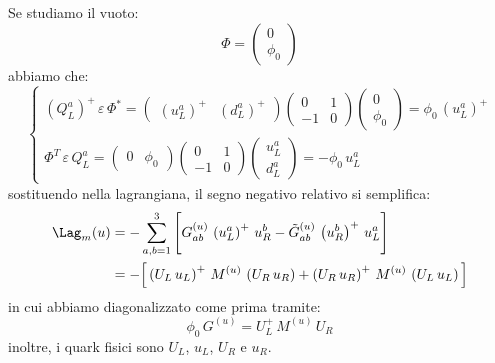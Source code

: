 Se studiamo il vuoto:
\begin{equation}
    \Phi = \begin{pmatrix}
        0 \\
        \phi_0
    \end{pmatrix}
\end{equation}
abbiamo che:
\begin{equation}
    \begin{cases}
        \left(Q_L^a\right)^+\, \varepsilon\, \Phi^* = \begin{pmatrix}
            \left(u_L^a\right)^+ & \left(d_L^a\right)^+
        \end{pmatrix}\begin{pmatrix}
            0 & 1 \\
            -1 & 0
        \end{pmatrix} \begin{pmatrix}
            0 \\
            \phi_0
        \end{pmatrix} = \phi_0\, \left(u_L^a\right)^+ \\
        \Phi^T\, \varepsilon\, Q_L^a = \begin{pmatrix}
            0 & \phi_0
        \end{pmatrix}\begin{pmatrix}
            0 & 1 \\
            -1 & 0
        \end{pmatrix} \begin{pmatrix}
            u_L^a \\
            d_L^a
        \end{pmatrix} = -\phi_0\, u_L^a
    \end{cases}
\end{equation}
sostituendo nella lagrangiana, il segno negativo relativo si semplifica:
\begin{align}
    \Lag_m(u) &= -\sum_{a,b=1}^3\Bigg[ G_{ab}^{(u)}\, \left(u_L^a\right)^+\, u_R^b - \tilde{G}_{ab}^{(u)}\, \left(u_R^b\right)^+\, u_L^a \Bigg] \\
    &= -\Big[ \left(U_L\, u_L\right)^+\, M^{(u)}\, \left(U_R\, u_R\right) + \left(U_R\, u_R\right)^+\, M^{(u)}\, \left(U_L\, u_L\right) \Big]
\end{align}
in cui abbiamo diagonalizzato come prima tramite:
\begin{equation}
    \phi_0\, G^{(u)} = U_L^+\, M^{(u)}\, U_R
\end{equation}
inoltre, i quark fisici sono $U_L$, $u_L$, $U_R$ e $u_R$. \\

